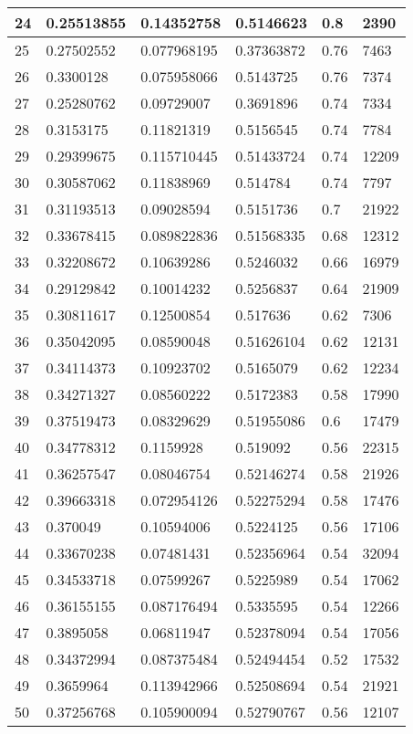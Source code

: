 \begin{longtable}{|l|l|l|l|l|l|}
24 & 0.25513855 & 0.14352758 & 0.5146623 & 0.8 & 2390 \\ \hline 
25 & 0.27502552 & 0.077968195 & 0.37363872 & 0.76 & 7463 \\ \hline 
26 & 0.3300128 & 0.075958066 & 0.5143725 & 0.76 & 7374 \\ \hline 
27 & 0.25280762 & 0.09729007 & 0.3691896 & 0.74 & 7334 \\ \hline 
28 & 0.3153175 & 0.11821319 & 0.5156545 & 0.74 & 7784 \\ \hline 
29 & 0.29399675 & 0.115710445 & 0.51433724 & 0.74 & 12209 \\ \hline 
30 & 0.30587062 & 0.11838969 & 0.514784 & 0.74 & 7797 \\ \hline 
31 & 0.31193513 & 0.09028594 & 0.5151736 & 0.7 & 21922 \\ \hline 
32 & 0.33678415 & 0.089822836 & 0.51568335 & 0.68 & 12312 \\ \hline 
33 & 0.32208672 & 0.10639286 & 0.5246032 & 0.66 & 16979 \\ \hline 
34 & 0.29129842 & 0.10014232 & 0.5256837 & 0.64 & 21909 \\ \hline 
35 & 0.30811617 & 0.12500854 & 0.517636 & 0.62 & 7306 \\ \hline 
36 & 0.35042095 & 0.08590048 & 0.51626104 & 0.62 & 12131 \\ \hline 
37 & 0.34114373 & 0.10923702 & 0.5165079 & 0.62 & 12234 \\ \hline 
38 & 0.34271327 & 0.08560222 & 0.5172383 & 0.58 & 17990 \\ \hline 
39 & 0.37519473 & 0.08329629 & 0.51955086 & 0.6 & 17479 \\ \hline 
40 & 0.34778312 & 0.1159928 & 0.519092 & 0.56 & 22315 \\ \hline 
41 & 0.36257547 & 0.08046754 & 0.52146274 & 0.58 & 21926 \\ \hline 
42 & 0.39663318 & 0.072954126 & 0.52275294 & 0.58 & 17476 \\ \hline 
43 & 0.370049 & 0.10594006 & 0.5224125 & 0.56 & 17106 \\ \hline 
44 & 0.33670238 & 0.07481431 & 0.52356964 & 0.54 & 32094 \\ \hline 
45 & 0.34533718 & 0.07599267 & 0.5225989 & 0.54 & 17062 \\ \hline 
46 & 0.36155155 & 0.087176494 & 0.5335595 & 0.54 & 12266 \\ \hline 
47 & 0.3895058 & 0.06811947 & 0.52378094 & 0.54 & 17056 \\ \hline 
48 & 0.34372994 & 0.087375484 & 0.52494454 & 0.52 & 17532 \\ \hline 
49 & 0.3659964 & 0.113942966 & 0.52508694 & 0.54 & 21921 \\ \hline 
50 & 0.37256768 & 0.105900094 & 0.52790767 & 0.56 & 12107 \\ \hline 
\end{longtable}